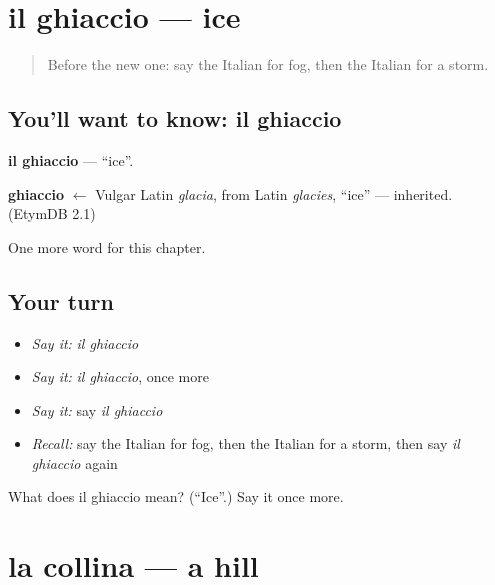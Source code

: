 \section[il ghiaccio]{il ghiaccio — ice}

\label{lesson:IT-C118-ghiaccio}



\begin{quote}
Before the new one: say the Italian for fog, then the Italian for a storm.
\end{quote}

\subsection*{You'll want to know: il ghiaccio}
\textbf{il ghiaccio} — \textquotedblleft{}ice\textquotedblright{}.

\begin{cousinweb}
\textbf{ghiaccio} $\leftarrow$ Vulgar Latin \emph{glacia}, from Latin \emph{glacies}, \textquotedblleft{}ice\textquotedblright{} — inherited. (EtymDB 2.1)
\end{cousinweb}

\begin{grammarlens}[title={What you've built}]
One more word for this chapter.
\end{grammarlens}

\subsection*{Your turn}
\begin{itemize}
\raggedright
  \item \emph{Say it:} \emph{il ghiaccio}
  \item \emph{Say it:} \emph{il ghiaccio}, once more
  \item \emph{Say it:} say \emph{il ghiaccio}
  \item \emph{Recall:} say the Italian for fog, then the Italian for a storm, then say \emph{il ghiaccio} again
\end{itemize}

\begin{tcolorbox}[breakable,colback=teal!4,colframe=teal!35!black,title={Before you move on}]
What does il ghiaccio mean? (\textquotedblleft{}Ice\textquotedblright{}.) Say it once more.
\end{tcolorbox}
\section[la collina]{la collina — a hill}

